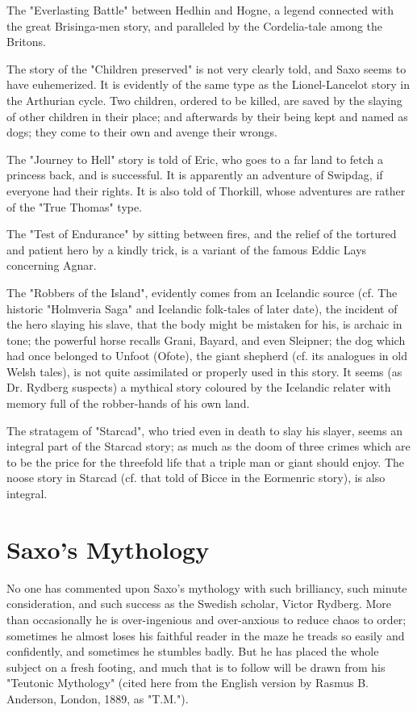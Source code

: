 \documentclass[10pt,a4paper]{report}
\begin{document}
The "Everlasting Battle" between Hedhin and Hogne, a legend connected with the great Brisinga-men story, and paralleled by the Cordelia-tale among the Britons.

The story of the "Children preserved" is not very clearly told, and Saxo seems to have euhemerized. It is evidently of the same type as the Lionel-Lancelot story in the Arthurian cycle. Two children, ordered to be killed, are saved by the slaying of other children in their place; and afterwards by their being kept and named as dogs; they come to their own and avenge their wrongs.

The "Journey to Hell" story is told of Eric, who goes to a far land to fetch a princess back, and is successful. It is apparently an adventure of Swipdag, if everyone had their rights. It is also told of Thorkill, whose adventures are rather of the "True Thomas" type.

The "Test of Endurance" by sitting between fires, and the relief of the tortured and patient hero by a kindly trick, is a variant of the famous Eddic Lays concerning Agnar.

The "Robbers of the Island", evidently comes from an Icelandic source (cf. The historic "Holmveria Saga" and Icelandic folk-tales of later date), the incident of the hero slaying his slave, that the body might be mistaken for his, is archaic in tone; the powerful horse recalls Grani, Bayard, and even Sleipner; the dog which had once belonged to Unfoot (Ofote), the giant shepherd (cf. its analogues in old Welsh tales), is not quite assimilated or properly used in this story. It seems (as Dr. Rydberg suspects) a mythical story coloured by the Icelandic relater with memory full of the robber-hands of his own land.

The stratagem of "Starcad", who tried even in death to slay his slayer, seems an integral part of the Starcad story; as much as the doom of three crimes which are to be the price for the threefold life that a triple man or giant should enjoy. The noose story in Starcad (cf. that told of Bicce in the Eormenric story), is also integral.





\chapter{Saxo's Mythology}

No one has commented upon Saxo's mythology with such brilliancy, such minute consideration, and such success as the Swedish scholar, Victor Rydberg. More than occasionally he is over-ingenious and over-anxious to reduce chaos to order; sometimes he almost loses his faithful reader in the maze he treads so easily and confidently, and sometimes he stumbles badly. But he has placed the whole subject on a fresh footing, and much that is to follow will be drawn from his "Teutonic Mythology" (cited here from the English version by Rasmus B. Anderson, London, 1889, as "T.M.").
\end{document}
